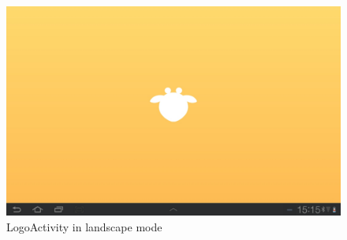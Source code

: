 \begin{figure}[h!]
	\centering
	\includegraphics[scale=0.3]{gfx/logo-activity_2.jpg}
	\caption{LogoActivity in landscape mode}
	\label{fig:logo-activity_2}
\end{figure}

